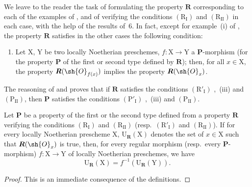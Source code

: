 \begin{remark}[7.3.11]
\label{IV.7.3.11}
We leave to the reader the task of formulating the property $\boldsymbol{R}$ corresponding to each of the examples of , and of verifying the conditions $(\mathrm{R_I})$ and $(\mathrm{R_{II}})$ in each case, with the help of the results of \textsection\,6.
In fact, except for example~(i) of , the property $\boldsymbol{R}$ satisfies in the other cases the following condition:
\begin{enumerate}
  \item[$(\mathrm{R}'_\mathrm{I})$] Let $\mathrm{X}$, $\mathrm{Y}$ be two locally Noetherian preschemes, $f:\mathrm{X}\to\mathrm{Y}$ a $\boldsymbol{P}$-morphism (for the property $\boldsymbol{P}$ of the first or second type defined by $\boldsymbol{R}$); then, for all $x\in\mathrm{X}$, the property $\boldsymbol{R}(\sh{O}_{f(x)})$ implies the property $\boldsymbol{R}(\sh{O}_x)$.
\end{enumerate}
The reasoning of  and  proves that if $\boldsymbol{R}$ satisfies the conditions $(\mathrm{R}'_\mathrm{I})$ ,~(iii) and $(\mathrm{P_{II}})$, then $\boldsymbol{P}$ satisfies the conditions $(\mathrm{P'_I})$ ,~(iii) and $(\mathrm{P_{II}})$.
\end{remark}

\begin{proposition}[7.3.12]
\label{IV.7.3.12}
Let $\boldsymbol{P}$ be a property of the first or the second type defined from a property $\boldsymbol{R}$ verifying the conditions $(\mathrm{R_I})$ and $(\mathrm{R_{II}})$ (resp.~$(\mathrm{R}'_\mathrm{I})$ and $(\mathrm{R_{II}})$).
If for every locally Noetherian prescheme $\mathrm{X}$, $\mathrm{U}_{\boldsymbol{R}}(\mathrm{X})$ denotes the set of $x\in\mathrm{X}$ such that $\boldsymbol{R}(\sh{O}_x)$ is true, then, for every regular morphism (resp.~every $\boldsymbol{P}$-morphism) $f:\mathrm{X}\to\mathrm{Y}$ of locally Noetherian preschemes, we have
\[
  \mathrm{U}_{\boldsymbol{R}}(\mathrm{X})=f^{-1}(\mathrm{U}_{\boldsymbol{R}}(\mathrm{Y})).
  \tag{7.3.12.1}
\label{IV.7.3.12.1}
\]
\end{proposition}

\begin{proof}
This is an immediate consequence of the definitions.
\end{proof}

